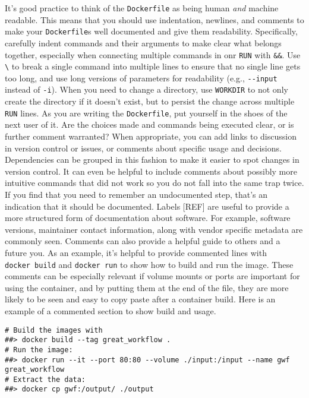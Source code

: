 \documentclass[10pt,letterpaper]{article}
\begin{document}
It's good practice to think of the \texttt{Dockerfile} as being human
\emph{and} machine readable. This means that you should use indentation,
newlines, and comments to make your \texttt{Dockerfile}s well documented
and give them readability. Specifically, carefully indent commands and
their arguments to make clear what belongs together, especially when
connecting multiple commands in onr \texttt{RUN} with \texttt{\&\&}. Use
\texttt{\textbackslash{}} to break a single command into multiple lines
to ensure that no single line gets too long, and use long versions of
parameters for readability (e.g., \texttt{-\/-input} instead of
\texttt{-i}). When you need to change a directory, use \texttt{WORKDIR}
to not only create the directory if it doesn't exist, but to persist the
change across multiple \texttt{RUN} lines. As you are writing the
\texttt{Dockerfile}, put yourself in the shoes of the next user of it.
Are the choices made and commands being executed clear, or is further
comment warranted? When appropriate, you can add links to discussion in
version control or issues, or comments about specific usage and
decisions. Dependencies can be grouped in this fashion to make it easier
to spot changes in version control. It can even be helpful to include
comments about possibly more intuitive commands that did not work so you
do not fall into the same trap twice. If you find that you need to
remember an undocumented step, that's an indication that it should be
documented. Labels {[}REF{]} are useful to provide a more structured
form of documentation about software. For example, software versions,
maintainer contact information, along with vendor specific metadata are
commonly seen. Comments can also provide a helpful guide to others and a
future you. As an example, it's helpful to provide commented lines with
\texttt{docker\ build} and \texttt{docker\ run} to show how to build and
run the image. These comments can be especially relevant if volume
mounts or ports are important for using the container, and by putting
them at the end of the file, they are more likely to be seen and easy to
copy paste after a container build. Here is an example of a commented
section to show build and usage.

\begin{verbatim}
# Build the images with
##> docker build --tag great_workflow .
# Run the image:
##> docker run --it --port 80:80 --volume ./input:/input --name gwf great_workflow
# Extract the data:
##> docker cp gwf:/output/ ./output
\end{verbatim}
\end{document}
